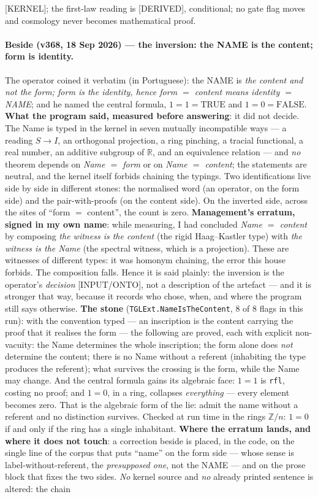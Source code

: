 \documentclass[11pt]{article}
\theoremstyle{definition}\newtheorem{deriv}{Derivation}
\begin{document}
[KERNEL]; the first-law reading is [DERIVED], conditional; no gate flag moves and cosmology never becomes mathematical proof.

\paragraph*{Beside (v368, 18 Sep 2026) --- the inversion: the NAME is the content; form is identity.} The operator coined it verbatim (in Portuguese): the NAME is \emph{the content and not the form; form is the identity, hence form $=$ content means identity $=$ NAME}; and he named the central formula, $1=1=\mathrm{TRUE}$ and $1=0=\mathrm{FALSE}$. \textbf{What the program said, measured before answering}: it did not decide. The Name is typed in the kernel in seven mutually incompatible ways --- a reading $S\to I$, an orthogonal projection, a ring pinching, a tracial functional, a real number, an additive subgroup of $\mathbb{R}$, and an equivalence relation --- and \emph{no} theorem depends on \emph{Name $=$ form} or on \emph{Name $=$ content}; the statements are neutral, and the kernel itself forbids chaining the typings. Two identifications live side by side in different stones: the normalised word (an operator, on the form side) and the pair-with-proofs (on the content side). On the inverted side, across the sites of ``form $=$ content'', the count is zero. \textbf{Management's erratum, signed in my own name}: while measuring, I had concluded \emph{Name $=$ content} by composing \emph{the witness is the content} (the rigid Haag--Kastler type) with \emph{the witness is the Name} (the spectral witness, which is a projection). These are witnesses of different types: it was homonym chaining, the error this house forbids. The composition falls. Hence it is said plainly: the inversion is the operator's \emph{decision} [INPUT/ONTO], not a description of the artefact --- and it is stronger that way, because it records who chose, when, and where the program still says otherwise. \textbf{The stone} (\texttt{TGLExt.NameIsTheContent}, 8 of 8 flags in this run): with the convention typed --- an inscription is the content carrying the proof that it realises the form --- the following are proved, each with explicit non-vacuity: the Name determines the whole inscription; the form alone does \emph{not} determine the content; there is no Name without a referent (inhabiting the type produces the referent); what survives the crossing is the form, while the Name may change. And the central formula gains its algebraic face: $1=1$ is \texttt{rfl}, costing no proof; and $1=0$, in a ring, collapses \emph{everything} --- every element becomes zero. That is the algebraic form of the lie: admit the name without a referent and no distinction survives. Checked at run time in the rings $\mathbb{Z}/n$: $1=0$ if and only if the ring has a single inhabitant. \textbf{Where the erratum lands, and where it does not touch}: a correction beside is placed, in the code, on the single line of the corpus that puts ``name'' on the form side --- whose sense is label-without-referent, the \emph{presupposed one}, not the NAME --- and on the prose block that fixes the two sides. \emph{No} kernel source and \emph{no} already printed sentence is altered: the chain 
\end{document}
